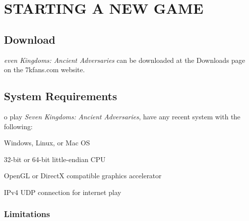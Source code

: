 
\chapter[Starting a New Game]{{\Huge S}TARTING A {\Huge N}EW {\Huge G}AME}

\section{\textsf{Download}}

\textit{even Kingdoms: Ancient Adversaries} can be downloaded at the Downloads page on the 7kfans.com website.


\section{\textsf{System Requirements}}


o play \textit{Seven Kingdoms: Ancient Adversaries}, have any recent system with the following:

\begin{changemargin}{0.5cm}{0cm} 
Windows, Linux, or Mac OS

32-bit or 64-bit little-endian CPU

OpenGL or DirectX compatible graphics accelerator

IPv4 UDP connection for internet play
\end{changemargin}

\subsection{\textsf{Limitations}}

